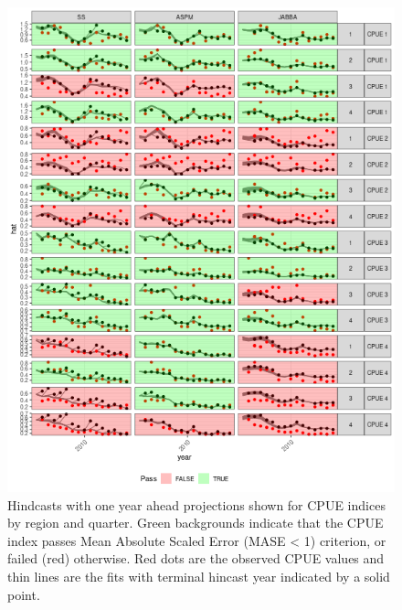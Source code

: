 \documentclass[12pt,halfline,a4paper,nonumbib]{ouparticle}
\begin{document}
\begin{figure}[htbp]
\centering
\includegraphics[width=6in]{figures/final-hy-plot-1.png}
\caption{Hindcasts with one year ahead projections shown for CPUE indices by region and quarter. Green backgrounds indicate that the CPUE index passes Mean Absolute Scaled Error (MASE < 1) criterion, or failed (red) otherwise. Red dots are the observed CPUE values and thin lines are the fits with terminal hincast year indicated by a solid point.}
\label{fig:hy}
\end{figure}
\end{document}
